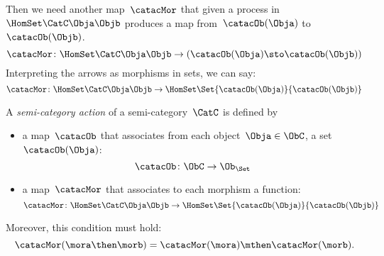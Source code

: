 Then we need another map~$\catacMor$ that given a process in~$\HomSet\CatC\Obja\Objb$
produces a map from~$\catacOb(\Obja)$ to~$\catacOb(\Objb)$.
%
\begin{equation}\label{eq:gamma-1}
  \catacMor\colon \HomSet\CatC\Obja\Objb \to  (\catacOb(\Obja) \sto \catacOb(\Objb))
\end{equation}
%
Interpreting the arrows as morphisms in sets, we can say:
\begin{equation}\label{eq:gamma-2}
  \catacMor\colon \HomSet\CatC\Obja\Objb \to  \HomSet\Set{\catacOb(\Obja)}{\catacOb(\Objb) }
\end{equation}

\begin{ctdefinition}\label{def:semicategory-action}
  A \emph{semi-category action} of a semi-category~$\CatC$ is defined by
  \begin{itemize}
    \item a map~$\catacOb$ that associates from each object~$\Obja \in \ObC$, a set~$\catacOb(\Obja)$:
    \begin{equation}
      \catacOb \colon \ObC \to \Ob_\Set
    \end{equation}
    \item a map~$\catacMor$ that associates to each morphism a function:
    \begin{equation}
      \catacMor\colon \HomSet\CatC\Obja\Objb \to  \HomSet\Set{\catacOb(\Obja)}{\catacOb(\Objb) }
    \end{equation}
  \end{itemize}
  Moreover, this condition must hold:
  \begin{equation}
    \catacMor(\mora\then\morb) = \catacMor(\mora) \mthen \catacMor(\morb).
  \end{equation}
\end{ctdefinition}

